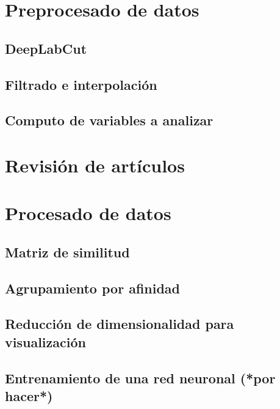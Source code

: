 \section{Preprocesado de datos}

\subsection{DeepLabCut}

\subsection{Filtrado e interpolación}

\subsection{Computo de variables a analizar}

\newpage
\section{Revisión de artículos}

\newpage
\section{Procesado de datos}

\subsection{Matriz de similitud}

\subsection{Agrupamiento por afinidad}

\subsection{Reducción de dimensionalidad para visualización}

\subsection{Entrenamiento de una red neuronal (*por hacer*)}


